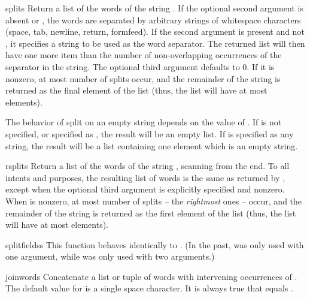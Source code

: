 \begin{funcdesc}{split}{s}
  Return a list of the words of the string .  If the optional
  second argument  is absent or , the words are
  separated by arbitrary strings of whitespace characters (space, tab, 
  newline, return, formfeed).  If the second argument  is
  present and not , it specifies a string to be used as the 
  word separator.  The returned list will then have one more item
  than the number of non-overlapping occurrences of the separator in
  the string.  The optional third argument  defaults to
  0.  If it is nonzero, at most  number of splits occur,
  and the remainder of the string is returned as the final element of
  the list (thus, the list will have at most 
  elements).

  The behavior of split on an empty string depends on the value of .
  If  is not specified, or specified as , the result will
  be an empty list.  If  is specified as any string, the result will
  be a list containing one element which is an empty string.
\end{funcdesc}

\begin{funcdesc}{rsplit}{s}
  Return a list of the words of the string , scanning 
  from the end.  To all intents and purposes, the resulting list of
  words is the same as returned by , except when the
  optional third argument  is explicitly specified and
  nonzero.  When  is nonzero, at most 
  number of splits -- the \emph{rightmost} ones -- occur, and the remainder
  of the string is returned as the first element of the list (thus, the
  list will have at most  elements).
\end{funcdesc}

\begin{funcdesc}{splitfields}{s}
  This function behaves identically to .  (In the
  past,  was only used with one argument, while
   was only used with two arguments.)
\end{funcdesc}

\begin{funcdesc}{join}{words}
  Concatenate a list or tuple of words with intervening occurrences of 
  .  The default value for  is a single space
  character.  It is always true that
  equals .
\end{funcdesc}

